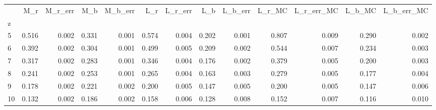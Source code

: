 \begin{tabular}{lrrrrrrrrrrrr}
\toprule
{} &    M\_r &  M\_r\_err &    M\_b &  M\_b\_err &    L\_r &  L\_r\_err &    L\_b &  L\_b\_err &  L\_r\_MC &  L\_r\_err\_MC &  L\_b\_MC &  L\_b\_err\_MC \\
z  &        &          &        &          &        &          &        &          &         &             &         &             \\
\midrule
5  &  0.516 &    0.002 &  0.331 &    0.001 &  0.574 &    0.004 &  0.202 &    0.001 &   0.807 &       0.009 &   0.290 &       0.002 \\
6  &  0.392 &    0.002 &  0.304 &    0.001 &  0.499 &    0.005 &  0.209 &    0.002 &   0.544 &       0.007 &   0.234 &       0.003 \\
7  &  0.317 &    0.002 &  0.283 &    0.001 &  0.346 &    0.004 &  0.176 &    0.002 &   0.379 &       0.005 &   0.200 &       0.003 \\
8  &  0.241 &    0.002 &  0.253 &    0.001 &  0.265 &    0.004 &  0.163 &    0.003 &   0.279 &       0.005 &   0.177 &       0.004 \\
9  &  0.178 &    0.002 &  0.221 &    0.002 &  0.200 &    0.005 &  0.147 &    0.005 &   0.200 &       0.005 &   0.147 &       0.006 \\
10 &  0.132 &    0.002 &  0.186 &    0.002 &  0.158 &    0.006 &  0.128 &    0.008 &   0.152 &       0.007 &   0.116 &       0.010 \\
\bottomrule
\end{tabular}
